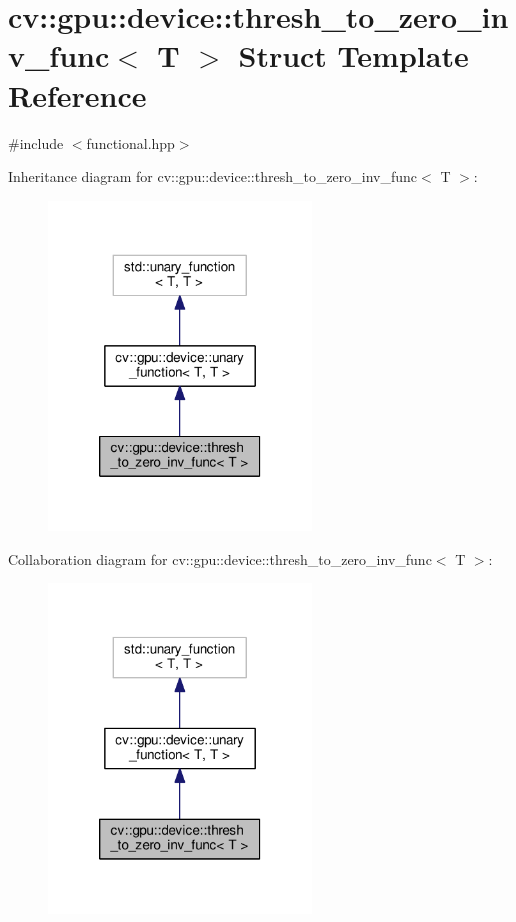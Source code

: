 \hypertarget{structcv_1_1gpu_1_1device_1_1thresh__to__zero__inv__func}{\section{cv\-:\-:gpu\-:\-:device\-:\-:thresh\-\_\-to\-\_\-zero\-\_\-inv\-\_\-func$<$ T $>$ Struct Template Reference}
\label{structcv_1_1gpu_1_1device_1_1thresh__to__zero__inv__func}
}


{\ttfamily \#include $<$functional.\-hpp$>$}



Inheritance diagram for cv\-:\-:gpu\-:\-:device\-:\-:thresh\-\_\-to\-\_\-zero\-\_\-inv\-\_\-func$<$ T $>$\-:\nopagebreak
\begin{figure}[H]
\begin{center}
\leavevmode
\includegraphics[width=198pt]{structcv_1_1gpu_1_1device_1_1thresh__to__zero__inv__func__inherit__graph}
\end{center}
\end{figure}


Collaboration diagram for cv\-:\-:gpu\-:\-:device\-:\-:thresh\-\_\-to\-\_\-zero\-\_\-inv\-\_\-func$<$ T $>$\-:\nopagebreak
\begin{figure}[H]
\begin{center}
\leavevmode
\includegraphics[width=198pt]{structcv_1_1gpu_1_1device_1_1thresh__to__zero__inv__func__coll__graph}
\end{center}
\end{figure}
